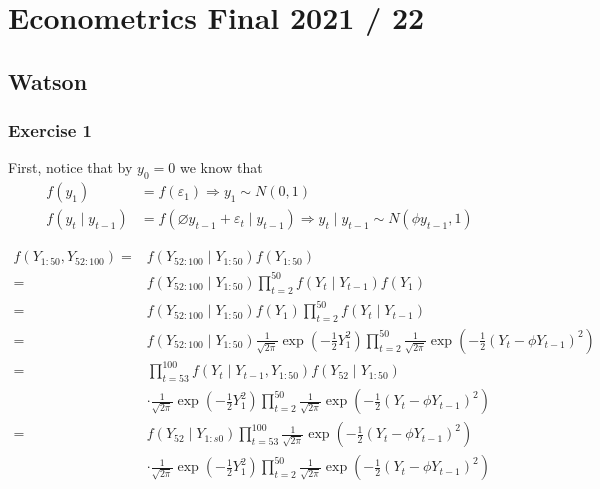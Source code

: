 \section{Econometrics Final 2021 / 22}

{
\subsection*{Watson}

{
\subsubsection*{Exercise 1}

First, notice that by $y_0 = 0$ we know that
$$
\begin{aligned}
f\left(y_{1}\right) &= f\left(\varepsilon_{1}\right) \Rightarrow y_{1} \sim N(0,1) \\
f\left(y_{t} \mid y_{t-1}\right) &= f\left(\varnothing y_{t-1}+\varepsilon_{t}\mid {y_{t-1}}\right) \Rightarrow y_{t} \mid y_{t-1} \sim N\left(\phi y_{t-1}, 1\right)
\end{aligned}
$$

$$
\begin{aligned}
f \left( Y_{1: 50}, Y_{52: 100}\right)= & f\left(Y_{52: 100} \mid Y_{1: 50}\right) f\left(Y_{1: 50}\right) \\
= & f\left(Y_{52: 100} \mid Y_{1: 50}\right) \prod_{t=2}^{50} f\left(Y_{t}\mid Y_{t-1}\right) f\left(Y_{1}\right) \\
= & f\left(Y_{52: 100} \mid Y_{1: 50}\right) f\left(Y_{1}\right) \prod_{t=2}^{50} f\left(Y_{t} \mid Y_{t-1}\right) \\
= & f\left(Y_{52: 100} \mid Y_{1: 50}\right) \frac{1}{\sqrt{2 \pi}} \exp \left(-\frac{1}{2} Y_{1}^{2}\right) \prod_{t=2}^{50} \frac{1}{\sqrt{2 \pi}} \exp \left(-\frac{1}{2}\left(Y_{t}-\phi Y_{t-1}\right)^{2}\right) \\
= & \prod_{t=53}^{100} f\left(Y_{t}\mid Y_{t-1}, Y_{1: 50}\right) f\left(Y_{52} \mid  Y_{1: 50}\right) \\
&\cdot \frac{1}{\sqrt{2 \pi}} \exp \left(-\frac{1}{2} Y_{1}^{2}\right) \prod_{t=2}^{50} \frac{1}{\sqrt{2 \pi}} \exp \left(-\frac{1}{2}\left(Y_{t}-\phi Y_{t-1}\right)^{2}\right)\\
=&f\left(Y_{52} \mid Y_{1: s 0}\right) \prod_{t=53}^{100} \frac{1}{\sqrt{2 \pi}} \exp \left(-\frac{1}{2}\left(Y_{t}-\phi Y_{t-1}\right)^{2}\right) \\
&\cdot\frac{1}{\sqrt{2 \pi}} \exp \left(-\frac{1}{2} Y_{1}^{2}\right) \prod_{t=2}^{50} \frac{1}{\sqrt{2 \pi}} \exp \left(-\frac{1}{2}\left(Y_{t}-\phi Y_{t-1}\right)^{2}\right)
\end{aligned}
$$

}}
